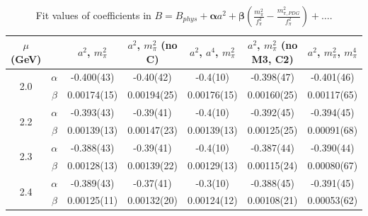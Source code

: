 \documentclass[12pt]{extarticle}
\begin{document}
\begin{table}[h!]
\begin{center}
\begin{tabular}{|c c|c|c|c|c|c|}
\hline
$\mu$ (GeV) &  & $a^2$, $m_\pi^2$& $a^2$, $m_\pi^2$ (no C)& $a^2$, $a^4$, $m_\pi^2$& $a^2$, $m_\pi^2$ (no M3, C2)& $a^2$, $m_\pi^2$, $m_\pi^4$\\
\hline
\multirow{2}{0.5in}{2.0} & $\alpha$ & -0.400(43)& -0.40(42)& -0.4(10)& -0.398(47)& -0.401(46)\\
 & $\beta$ & 0.00174(15)& 0.00194(25)& 0.00176(15)& 0.00160(25)& 0.00117(65)\\
\hline
\multirow{2}{0.5in}{2.2} & $\alpha$ & -0.393(43)& -0.39(41)& -0.4(10)& -0.392(45)& -0.394(45)\\
 & $\beta$ & 0.00139(13)& 0.00147(23)& 0.00139(13)& 0.00125(25)& 0.00091(68)\\
\hline
\multirow{2}{0.5in}{2.3} & $\alpha$ & -0.388(43)& -0.39(41)& -0.4(10)& -0.387(44)& -0.390(44)\\
 & $\beta$ & 0.00128(13)& 0.00139(22)& 0.00129(13)& 0.00115(24)& 0.00080(67)\\
\hline
\multirow{2}{0.5in}{2.4} & $\alpha$ & -0.389(43)& -0.37(41)& -0.3(10)& -0.388(45)& -0.391(45)\\
 & $\beta$ & 0.00125(11)& 0.00132(20)& 0.00124(12)& 0.00108(21)& 0.00053(62)\\
\hline
\end{tabular}
\caption{Fit values of coefficients in $B = B_{phys} + \mathbf{\alpha} a^2 + \mathbf{\beta}\left(\frac{m_\pi^2}{f_\pi^2}-\frac{m_{\pi,PDG}^2}{f_\pi^2}\right) + \ldots$.}
\end{center}
\end{table}




















\clearpage
\end{document}
